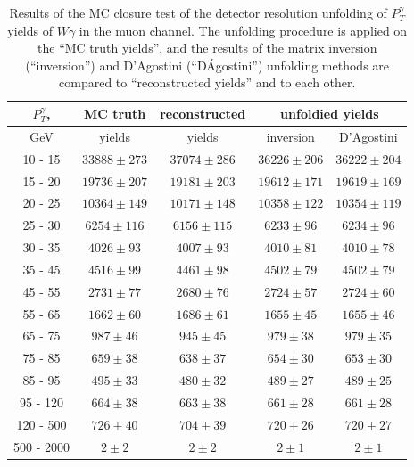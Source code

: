 \begin{table}[h]
  \scriptsize
  \begin{center}
  \caption{Results of the MC closure test of the detector resolution unfolding of $P_T^{\gamma}$ yields of $W\gamma$ in the muon channel. The unfolding procedure is applied on the ``MC truth yields'', and the results of the matrix inversion (``inversion'') and D'Agostini (``D\'Agostini'') unfolding methods are compared to ``reconstructed yields'' and to each other.}
  \begin{tabular}{|c|c|c|c|c|}
  \hline
  $P_T^{\gamma}$,&  MC truth         &   reconstructed &  \multicolumn{2}{|c|}{unfoldied yields} \\ \hline
  GeV          &  yields       &       yields        &  inversion &  D'Agostini \\ \hline
 10 -  15 &     $33888\pm 273$ &     $37074\pm 286$ &     $36226\pm206$ &     $36222\pm204$ \\ \hline
 15 -  20 &     $19736\pm 207$ &     $19181\pm 203$ &     $19612\pm171$ &     $19619\pm169$ \\ \hline
 20 -  25 &     $10364\pm 149$ &     $10171\pm 148$ &     $10358\pm122$ &     $10354\pm119$ \\ \hline
 25 -  30 &     $6254\pm 116$ &     $6156\pm 115$ &     $6233\pm96$ &     $6234\pm96$ \\ \hline
 30 -  35 &     $4026\pm  93$ &     $4007\pm  93$ &     $4010\pm81$ &     $4010\pm78$ \\ \hline
 35 -  45 &     $4516\pm  99$ &     $4461\pm  98$ &     $4502\pm79$ &     $4502\pm79$ \\ \hline
 45 -  55 &     $2731\pm  77$ &     $2680\pm  76$ &     $2724\pm57$ &     $2724\pm60$ \\ \hline
 55 -  65 &     $1662\pm  60$ &     $1686\pm  61$ &     $1655\pm45$ &     $1655\pm46$ \\ \hline
 65 -  75 &     $987\pm  46$ &     $945\pm  45$ &     $979\pm38$ &     $979\pm35$ \\ \hline
 75 -  85 &     $659\pm  38$ &     $638\pm  37$ &     $654\pm30$ &     $653\pm30$ \\ \hline
 85 -  95 &     $495\pm  33$ &     $480\pm  32$ &     $489\pm27$ &     $489\pm25$ \\ \hline
 95 - 120 &     $664\pm  38$ &     $663\pm  38$ &     $661\pm28$ &     $661\pm28$ \\ \hline
120 - 500 &     $726\pm  40$ &     $704\pm  39$ &     $720\pm26$ &     $720\pm27$ \\ \hline
500 - 2000 &     $2\pm   2$ &     $2\pm   2$ &     $2\pm1$ &     $2\pm1$ \\ \hline
  \end{tabular}
  \label{tab:unf_mc_closure_MUON_WGamma}
  \end{center}
\end{table}


